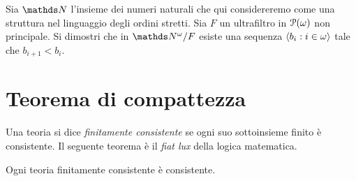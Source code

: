 \begin{exercise}
Sia $\NN$ l'insieme dei numeri naturali che qui considereremo come una struttura nel linguaggio degli ordini stretti.  Sia $F$ un ultrafiltro in $\P(\omega)$ non principale. Si dimostri che in $\NN^\omega/F$ esiste una sequenza $\<b_i: i\in\omega\>$ tale che $b_{i+1}<b_i$.\QED 
\end{exercise}


% 
% 



\section{Teorema di compattezza}\label{thmcompattezza}
Una teoria si dice \emph{finitamente consistente\/} se ogni suo sottoinsieme finito \`e consistente. Il seguente teorema \`e il \textit{fiat lux\/} della logica matematica. 

\begin{theorem}[di compattezza]\label{thmcompattezza}
Ogni teoria finitamente consistente \`e consistente. 
\end{theorem}

